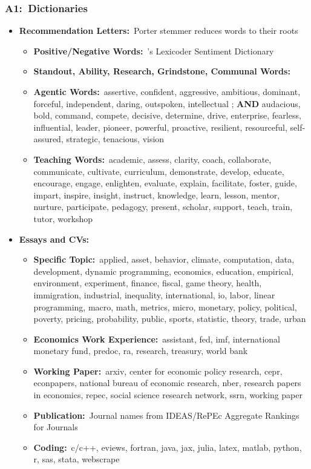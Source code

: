 \documentclass[12pt, aspectratio=169]{beamer}
\newcommand{\scripttiny}{\fontsize{7pt}{8pt}\selectfont}
\begin{document}
\begin{frame}[label=d]
\frametitle{A1:\ Dictionaries}
\begin{itemize}
\small
\item \textbf{Recommendation Letters:}\ Porter stemmer reduces words to their roots
\vspace{2.5pt}
\begin{itemize}
\scripttiny
\item \textbf{Positive/Negative Words:}\ \citet{young2012}'s Lexicoder Sentiment Dictionary
\item \textbf{Standout, Ability, Research, Grindstone, Communal Words:}\ \citet{bai2022}\!
\item \textbf{Agentic Words:}\ assertive, confident, aggressive, ambitious, dominant, forceful, independent, daring, outspoken, intellectual \citep{madera2009}; \textbf{AND} audacious, bold, command, compete, decisive, determine, drive, enterprise, fearless, influential, leader, pioneer, powerful, proactive, resilient, resourceful, self-assured, strategic, tenacious, vision
\item \textbf{Teaching Words:}\ academic, assess, clarity, coach, collaborate, communicate, cultivate, curriculum, demonstrate, develop, educate, encourage, engage, enlighten, evaluate, explain, facilitate, foster, guide, impart, inspire, insight, instruct, knowledge, learn, lesson, mentor, nurture, participate, pedagogy, present, scholar, support, teach, train, tutor, workshop
\end{itemize}
\item \textbf{Essays and CVs:}
\vspace{5pt}
\begin{itemize}
\scripttiny
\item \textbf{Specific Topic:}\ applied, asset, behavior, climate, computation, data, development, dynamic programming, economics, education, empirical, environment, experiment, finance, fiscal, game theory, health, immigration, industrial, inequality, international, io, labor, linear programming, macro, math, metrics, micro, monetary, policy, political, poverty, pricing, probability, public, sports, statistic, theory, trade, urban
\item \textbf{Economics Work Experience:}\ assistant, fed, imf, international monetary fund, predoc, ra, research, treasury, world bank
\item \textbf{Working Paper:}\ arxiv, center for economic policy research, cepr, econpapers, national bureau of economic research, nber,  research papers in economics, repec, social science research network, ssrn, working paper
\item \textbf{Publication:}\ Journal names from IDEAS/RePEc Aggregate Rankings for Journals
\item \textbf{Coding:}\ c/c++, eviews, fortran, java, jax, julia, latex, matlab, python, r, sas, stata, webscrape
\vspace{5pt}
\end{itemize}
\end{itemize}
\hyperlink{dd}{}
\end{frame}
\end{document}
